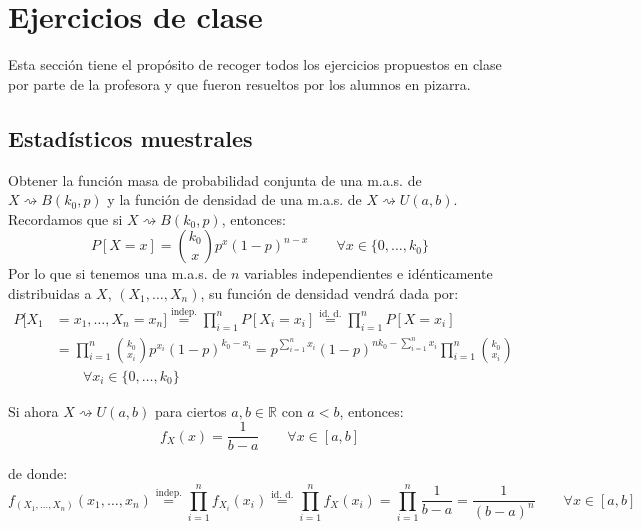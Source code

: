 \chapter{Ejercicios de clase}
\noindent
Esta sección tiene el propósito de recoger todos los ejercicios propuestos en clase por parte de la profesora y que fueron resueltos por los alumnos en pizarra.

\section{Estadísticos muestrales}
\begin{ejercicio}
    Obtener la función masa de probabilidad conjunta de una m.a.s. de $X\rightsquigarrow B(k_0,p)$ y la función de densidad de una m.a.s. de $X\rightsquigarrow U(a,b)$.\\

    \noindent
    Recordamos que si $X\rightsquigarrow B(k_0, p)$, entonces:
    \begin{equation*}
        P[X = x] = \binom{k_0}{x} p^x{(1-p)}^{n-x} \qquad \forall x\in \{0,\ldots,k_0\}
    \end{equation*}
    Por lo que si tenemos una m.a.s. de $n$ variables independientes e idénticamente distribuidas a $X$, $(X_1, \ldots, X_n)$, su función de densidad vendrá dada por:
    \begin{align*}
        P[X_1 &= x_1, \ldots, X_n = x_n] \stackrel{\text{indep.}}{=} \prod_{i=1}^{n}P[X_i = x_i]\stackrel{\text{id. d.}}{=} \prod_{i=1}^{n} P[X=x_i] \\
              &= \prod_{i=1}^{n} \binom{k_0}{x_i} p^{x_i} {(1-p)}^{k_0-x_i} = p^{\sum\limits_{i=1}^{n}x_i} {(1-p)}^{nk_0 - \sum\limits_{i=1}^{n}x_i} \prod_{i=1}^{n}\binom{k_0}{x_i} \\
              & \qquad \forall x_i \in \{0,\ldots,k_0\}
    \end{align*}

    \noindent
    Si ahora $X\rightsquigarrow U(a,b)$ para ciertos $a,b\in \mathbb{R}$ con $a<b$, entonces:
    \begin{equation*}
        f_X(x) = \dfrac{1}{b-a} \qquad \forall x\in [a,b]
    \end{equation*}

    de donde:
    \begin{equation*}
        f_{(X_1, \ldots, X_n)}(x_1, \ldots, x_n) \stackrel{\text{indep.}}{=} \prod_{i=1}^{n} f_{X_i}(x_i)\stackrel{\text{id. d.}}{=} \prod_{i=1}^{n} f_X(x_i) = \prod_{i=1}^{n} \dfrac{1}{b-a} = \dfrac{1}{{(b-a)}^{n}} \qquad \forall x\in [a,b]
    \end{equation*}
\end{ejercicio}

